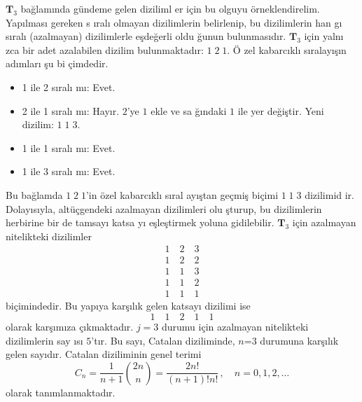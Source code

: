 \documentclass[a4paper,10pt]{article}
\begin{document}
$\mathbf{T}_{3}$ ba\u{g}lam{\i}nda g\"un\-de\-me ge\-len diziliml%
er i\c{c}in bu olguyu \"orneklendirelim. Yap\i lmas{\i} gereken s%
\i ral{\i} olmayan dizilimlerin belirlenip, bu di\-zilimlerin han%
g{\i} s\i ral{\i} (azalmayan) dizilimlerle e\c{s}de\u{g}erli oldu%
\u{g}unun bulunmas{\i}d\i r. $\mathbf{T}_{3}$ i\c{c}in yal\-n{\i}%
zca bir adet azalabilen dizilim bulunmaktad\i r: $1\; 2\; 1$. \"O%
zel kabarc\i kl{\i} s\i ralay\i \c{s}\i n ad\i mlar{\i} \c{s}u bi%
\c{c}imdedir. %
\begin{itemize}
 \item 1 ile 2 s\i ral{\i} m{\i}: Evet.
 \item 2 ile 1 s\i ral{\i} m{\i}: Hay\i r. $2$'ye $1$ ekle ve sa%
 \u{g}\i ndaki $1$ ile yer de\u{g}i\c{s}tir.
 Yeni dizilim: $1\; 1\; 3$.
 \item 1 ile 1 s\i ral{\i} m{\i}: Evet.
 \item 1 ile 3 s\i ral{\i} m{\i}: Evet.
\end{itemize}
Bu ba\u{g}lamda $1\; 2\; 1$'in \"ozel ka\-bar\-c\i kl{\i} s\i ral%
ay\i \c{s}tan ge\c{c}mi\c{s} bi\c{c}imi $1\; 1\; 3$ di\-zi\-limid%
ir. Dolay\i s\i yla, alt\"u\c{c}gendeki azalmayan dizilimleri olu%
\c{s}turup, bu dizilimlerin herbirine bir de tam\-sa\-y{\i} katsa%
y{\i} e\c{s}le\c{s}tirmek yoluna gidi\-lebilir. $\mathbf{T}_{3}$ %
i\c{c}in azalmayan nitelikteki dizilimler %
\begin{eqnarray}
 1\quad 2 \quad 3 \nonumber\\
 1\quad 2 \quad 2 \nonumber\\
 1\quad 1 \quad 3 \nonumber\\
 1\quad 1 \quad 2 \nonumber\\
 1\quad 1 \quad 1
\end{eqnarray}
bi\c{c}imindedir. Bu yap{\i}ya kar\c{s}\i l\i k gelen katsay{\i} %
dizilimi ise %
\begin{equation}
1\quad 1\quad 2\quad 1\quad 1
\label{eq:j3ise}
\end{equation}
olarak kar\c{s}\i m\i za \c{c}\i kmak\-tad\i r. $j=3$ du\-ru\-mu %
i\c{c}in azalmayan ni\-te\-lik\-te\-ki di\-zi\-lim\-le\-rin sa\-y%
{\i}s{\i} $5$'t\i r. Bu say{\i}, Catalan diziliminde, $n$=$3$ %
durumuna kar\c{s}\i l\i k gelen say\i d\i r. Catalan diziliminin %
genel terimi %
\begin{equation}
 C_{n} = \frac{1}{n+1}{2n \choose n} = \frac{2n!}{(n+1)!n!} \, ,
 \quad n=0,1,2,\ldots
\end{equation}
olarak tan\i mlanmaktad\i r.
\end{document}
